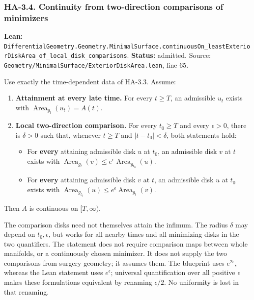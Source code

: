 \documentclass[
  letterpaper,
  11pt]{article}
\providecommand{\tightlist}{%
  \setlength{\itemsep}{0pt}\setlength{\parskip}{0pt}}
\begin{document}
\subsubsection{HA-3.4. Continuity from two-direction comparisons of
minimizers}\label{ha-3-4}

\textbf{Lean:}
{\small\texttt{Differential\allowbreak{}Geometry.\allowbreak{}Geometry.\allowbreak{}Minimal\allowbreak{}Surface.\allowbreak{}continuous\allowbreak{}On\_\allowbreak{}least\allowbreak{}Exterior\allowbreak{}Disk\allowbreak{}Area\_\allowbreak{}of\_\allowbreak{}local\_\allowbreak{}disk\_\allowbreak{}comparisons}}.
\textbf{Status:} admitted. Source:
{\small\texttt{Geometry/\allowbreak{}Minimal\allowbreak{}Surface/\allowbreak{}Exterior\allowbreak{}Disk\allowbreak{}Area.\allowbreak{}lean}},
line 65.

Use exactly the time-dependent data of HA-3.3. Assume:

\begin{enumerate}
\def\labelenumi{\arabic{enumi}.}
\tightlist
\item
  \textbf{Attainment at every late time.} For every \(t\ge T\), an
  admissible \(u_t\) exists with
  \(\operatorname{Area}_{g_t}(u_t)=A(t)\).
\item
  \textbf{Local two-direction comparison.} For every \(t_0\ge T\) and
  every \(\epsilon>0\), there is \(\delta>0\) such that, whenever
  \(t\ge T\) and \(|t-t_0|<\delta\), both statements hold:

  \begin{itemize}
  \tightlist
  \item
    For \textbf{every} attaining admissible disk \(u\) at \(t_0\), an
    admissible disk \(v\) at \(t\) exists with
    \(\operatorname{Area}_{g_t}(v)\le e^\epsilon
      \operatorname{Area}_{g_{t_0}}(u)\).
  \item
    For \textbf{every} attaining admissible disk \(v\) at \(t\), an
    admissible disk \(u\) at \(t_0\) exists with
    \(\operatorname{Area}_{g_{t_0}}(u)\le e^\epsilon
      \operatorname{Area}_{g_t}(v)\).
  \end{itemize}
\end{enumerate}

Then \(A\) is continuous on \([T,\infty)\).

The comparison disks need not themselves attain the infimum. The radius
\(\delta\) may depend on \(t_0,\epsilon\), but works for all nearby
times and all minimizing disks in the two quantifiers. The statement
does not require comparison maps between whole manifolds, or a
continuously chosen minimizer. It does not supply the two comparisons
from surgery geometry; it assumes them. The blueprint uses
\(e^{2\epsilon}\), whereas the Lean statement uses \(e^\epsilon\);
universal quantification over all positive \(\epsilon\) makes these
formulations equivalent by renaming \(\epsilon/2\). No uniformity is
lost in that renaming.
\end{document}
